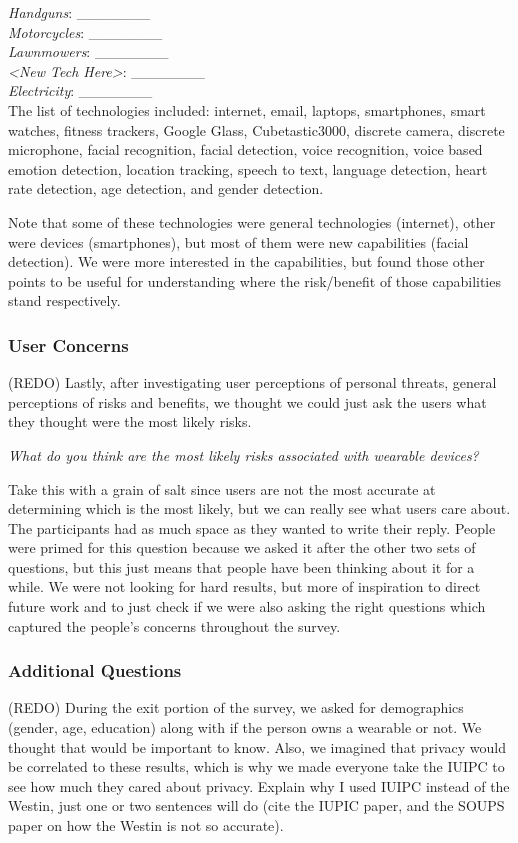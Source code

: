\documentclass{acm_proc_article-sp}
\begin{document}
\textit{Handguns}: \_\_\_\_\_\_\_ \\
\textit{Motorcycles}: \_\_\_\_\_\_\_\\
\textit{Lawnmowers}: \_\_\_\_\_\_\_\\
\textit{<New Tech Here>}: \_\_\_\_\_\_\_\\
\textit{Electricity}: \_\_\_\_\_\_\_\\

The list of technologies included: internet, email, laptops, smartphones, smart watches, fitness trackers, Google Glass, Cubetastic3000, discrete camera, discrete microphone, facial recognition, facial detection, voice recognition, voice based emotion detection, location tracking, speech to text, language detection, heart rate detection, age detection, and gender detection. 

Note that some of these technologies were general technologies (internet), other were devices (smartphones), but most of them were new capabilities (facial detection). We were more interested in the capabilities, but found those other points to be useful for understanding where the risk/benefit of those capabilities stand respectively. 

\subsubsection{User Concerns}
(REDO) Lastly, after investigating user perceptions of personal threats, general perceptions of risks and benefits, we thought we could just ask the users what they thought were the most likely risks. 

\textit{What do you think are the most likely risks associated with wearable devices?}

Take this with a grain of salt since users are not the most accurate at determining which is the most likely, but we can really see what users care about. The participants had as much space as they wanted to write their reply. People were primed for this question because we asked it after the other two sets of questions, but this just means that people have been thinking about it for a while. We were not looking for hard results, but more of inspiration to direct future work and to just check if we were also asking the right questions which captured the people's concerns throughout the survey. 

\subsubsection{Additional Questions}
(REDO) During the exit portion of the survey, we asked for demographics (gender, age, education) along with if the person owns a wearable or not. We thought that would be important to know. Also, we imagined that privacy would be correlated to these results, which is why we made everyone take the IUIPC to see how much they cared about privacy. Explain why I used IUIPC instead of the Westin, just one or two sentences will do (cite the IUPIC paper, and the SOUPS paper on how the Westin is not so accurate). 
\end{document}
